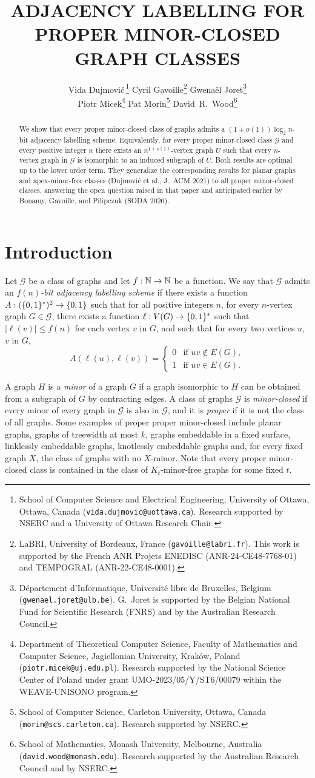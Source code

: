 \documentclass{patmorin}
\title{\MakeUppercase{\boldmath  Adjacency labelling for proper minor-closed graph classes}}
\author{
 Vida Dujmovi{\'c}\,\footnote{School of Computer Science and Electrical Engineering, University of Ottawa, Ottawa, Canada (\texttt{vida.dujmovic@uottawa.ca}). Research supported by NSERC and a University of Ottawa Research Chair.}
 \qquad
 Cyril Gavoille\footnote{LaBRI, University of Bordeaux, France (\texttt{gavoille@labri.fr}). This work is supported by the French ANR Projets ENEDISC (ANR-24-CE48-7768-01) and TEMPOGRAL (ANR-22-CE48-0001).}
 \qquad
  Gwena\"el Joret\footnote{D\'epartement d'Informatique, Universit\'e libre de Bruxelles, Belgium ({\tt gwenael.joret@ulb.be}). G.\ Joret is supported by the Belgian National Fund for Scientific Research (FNRS) and by the Australian Research Council.}\\[1ex]
Piotr Micek\footnote{Department of Theoretical Computer Science, Faculty of Mathematics and Computer Science, Jagiellonian University, Kraków, Poland (\texttt{piotr.micek@uj.edu.pl}). Research supported by the National Science Center of Poland under grant UMO-2023/05/Y/ST6/00079 within the WEAVE-UNISONO program.}
 \qquad
 Pat Morin\footnote{School of Computer Science, Carleton University, Ottawa, Canada (\texttt{morin@scs.carleton.ca}). Research supported by NSERC.}
 \qquad
 David~R.~Wood\footnote{School of Mathematics, Monash University, Melbourne, Australia (\texttt{david.wood@monash.edu}). Research supported by the Australian Research Council and by NSERC.}
 }
\date{}
\renewcommand{\leq}{\leqslant}
\newcommand{\defin}[1]{\emph{\textcolor{brightmaroon}{#1}}}
\DeclarePairedDelimiter{\set}{\{}{\}}
\newcommand{\calG}{\mathcal{G}}
\begin{document}
\maketitle

\begin{abstract}
  We show that every proper minor-closed class of graphs admits a $(1+o(1))\log_2 n$-bit adjacency labelling scheme. Equivalently, for every proper minor-closed class $\calG$ and every positive integer $n$ there exists an $n^{1+o(1)}$-vertex graph $U$ such that every $n$-vertex graph in $\calG$ is isomorphic to an induced subgraph of $U$.   Both results are optimal up to the lower order term. They generalize the corresponding results for planar graphs and apex-minor-free classes (Dujmovi\'c et al., J.~ACM 2021) to all proper minor-closed classes, answering the open question raised in that paper and anticipated earlier by Bonamy, Gavoille, and Pilipczuk (SODA 2020).



\end{abstract}


\bigskip
\section{Introduction}
Let $\calG$ be a class of graphs and let $f:\mathbb{N}\to\mathbb{N}$ be a function.
We say that $\calG$ admits an \defin{$f(n)$-bit adjacency labelling scheme} if there exists a function $A:(\set{0,1}^*)^2\to\set{0,1}$ such that for all positive integers $n$, for every $n$-vertex graph $G\in\calG$, there exists a function $\ell: V(G)\to\set{0,1}^*$ such that
$|\ell(v)|\leq f(n)$ for each vertex $v$ in $G$, and such that
for every two vertices $u$, $v$ in $G$,
\[
  A(\ell(u),\ell(v))=\begin{cases}
    0 & \textrm{if $uv\notin E(G)$}, \\
    1 & \textrm{if $uv\in E(G)$}.
  \end{cases}
\]


A graph $H$ is a \defin{minor} of a graph $G$ if a graph isomorphic to $H$ can
be obtained from a subgraph of $G$ by contracting edges. A class of graphs
$\calG$ is \defin{minor-closed} if every minor of every graph in
$\calG$ is also in $\calG$, and it is \defin{proper} if it is not the class of all graphs. Some examples of proper proper minor-closed include planar graphs, graphs of treewidth at most $k$, graphs embeddable in a fixed
surface, linklessly embeddable graphs, knotlessly embeddable graphs and, for every fixed graph $X$, the class of graphs with no $X$-minor. Note that every proper minor-closed class is contained in the class of $K_t$-minor-free graphs for some fixed $t$.
\end{document}
